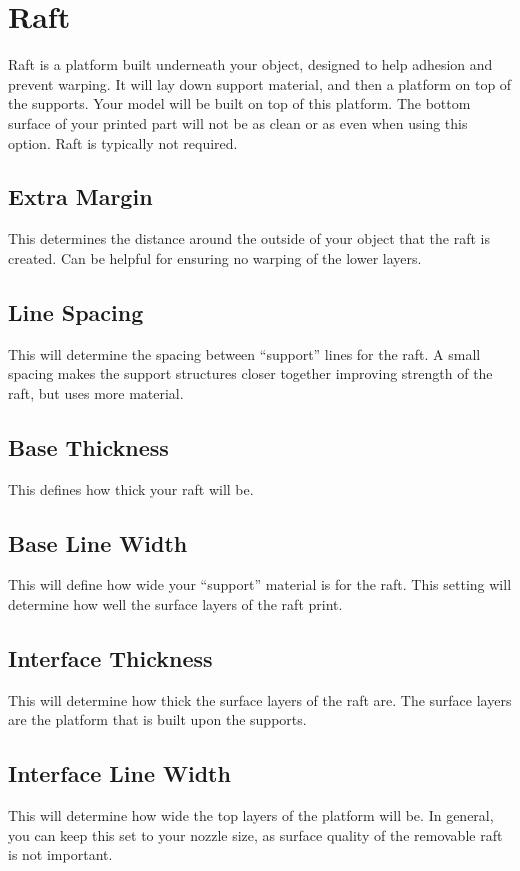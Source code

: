\section{Raft}
Raft is a platform built underneath your object, designed to help adhesion and prevent warping. It will lay down support material, and then a platform on top of the supports. Your model will be built on top of this platform. The bottom surface of your printed part will not be as clean or as even when using this option. Raft is typically not required.

\subsection{Extra Margin}
This determines the distance around the outside of your object that the raft is created. Can be helpful for ensuring no warping of the lower layers.

\subsection{Line Spacing}
This will determine the spacing between “support” lines for the raft. A small spacing makes the support structures closer together improving strength of the raft, but uses more material.

\subsection{Base Thickness}
This defines how thick your raft will be.

\subsection{Base Line Width}
This will define how wide your “support” material is for the raft. This setting will determine how well the surface layers of the raft print.

\subsection{Interface Thickness}
This will determine how thick the surface layers of the raft are. The surface layers are the platform that is built upon the supports.

\subsection{Interface Line Width}
This will determine how wide the top layers of the platform will be. In general, you can keep this set to your nozzle size, as surface quality of the removable raft is not important.

